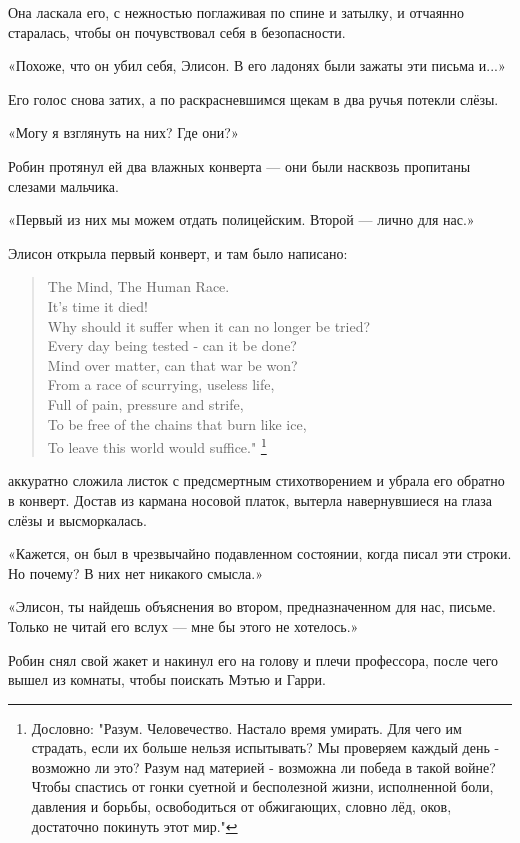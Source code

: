 \documentclass[a4paper,12pt]{book}
\begin{document}
Она ласкала его, с нежностью поглаживая по спине и затылку, и отчаянно старалась, чтобы он почувствовал себя в безопасности.
\par
«Похоже, что он убил себя, Элисон. В его ладонях были зажаты эти письма и...»
\par
Его голос снова затих, а по раскрасневшимся щекам в два ручья потекли слёзы.
\par
«Могу я взглянуть на них? Где они?»
\par
Робин протянул ей два влажных конверта — они были насквозь пропитаны слезами мальчика.
\par
«Первый из них мы можем отдать полицейским. Второй — лично для нас.»
\par
Элисон открыла первый конверт, и там было написано:
\begin{quote}
The Mind, The Human Race.\\
It's time it died!\\
Why should it suffer when it can no longer be tried?\\
Every day being tested - can it be done?\\
Mind over matter, can that war be won?\\
From a race of scurrying, useless life,\\
Full of pain, pressure and strife,\\
To be free of the chains that burn like ice,\\
To leave this world would suffice." \footnote[1]{Дословно: "Разум. Человечество. Настало время умирать. Для чего им страдать, если их больше нельзя испытывать? Мы проверяем каждый день - возможно ли это? Разум над материей - возможна ли победа в такой войне? Чтобы спастись от гонки суетной и бесполезной жизни, исполненной боли, давления и борьбы, освободиться от обжигающих, словно лёд, оков, достаточно покинуть этот мир."}
\end{quote}
\noindent{} аккуратно сложила листок с предсмертным стихотворением и убрала его обратно в конверт. Достав из кармана носовой платок, вытерла навернувшиеся на глаза слёзы и высморкалась.
\par
«Кажется, он был в чрезвычайно подавленном состоянии, когда писал эти строки. Но почему? В них нет никакого смысла.»
\par
«Элисон, ты найдешь объяснения во втором, предназначенном для нас, письме. Только не читай его вслух — мне бы этого не хотелось.»
\par
Робин снял свой жакет и накинул его на голову и плечи профессора, после чего вышел из комнаты, чтобы поискать Мэтью и Гарри.
\end{document}
